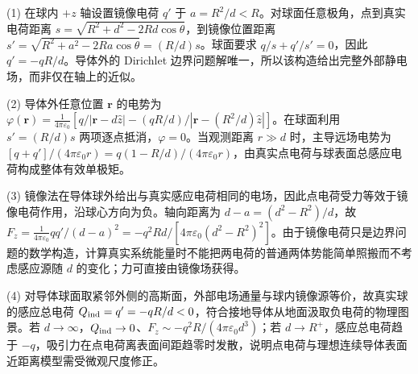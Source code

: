 (1) 在球内 \(+z\) 轴设置镜像电荷 \(q'\) 于 \(a=R^2/d<R\)。对球面任意极角，点到真实电荷距离 \(s=\sqrt{R^2+d^2-2Rd\cos\theta}\)，到镜像位置距离 \(s'=\sqrt{R^2+a^2-2Ra\cos\theta}=(R/d)s\)。球面要求 \(q/s+q'/s'=0\)，因此 \(q'=-qR/d\)。导体外的 Dirichlet 边界问题解唯一，所以该构造给出完整外部静电场，而非仅在轴上的近似。

(2) 导体外任意位置 \(\mathbf r\) 的电势为 \(\varphi(\mathbf r)=\frac{1}{4\pi\varepsilon_0}[q/|\mathbf r-d\hat z|-(qR/d)/|\mathbf r-(R^2/d)\hat z|]\)。在球面利用 \(s'=(R/d)s\) 两项逐点抵消，\(\varphi=0\)。当观测距离 \(r\gg d\) 时，主导远场电势为 \([q+q']/ (4\pi\varepsilon_0r)=q(1-R/d)/(4\pi\varepsilon_0r)\)，由真实点电荷与球表面总感应电荷构成整体有效单极矩。

(3) 镜像法在导体球外给出与真实感应电荷相同的电场，因此点电荷受力等效于镜像电荷作用，沿球心方向为负。轴向距离为 \(d-a=(d^2-R^2)/d\)，故 \(F_z=\frac1{4\pi\varepsilon_0}qq'/(d-a)^2=-q^2Rd/[4\pi\varepsilon_0(d^2-R^2)^2]\)。由于镜像电荷只是边界问题的数学构造，计算真实系统能量时不能把两电荷的普通两体势能简单照搬而不考虑感应源随 \(d\) 的变化；力可直接由镜像场获得。

(4) 对导体球面取紧邻外侧的高斯面，外部电场通量与球内镜像源等价，故真实球的感应总电荷 \(Q_{\rm ind}=q'=-qR/d<0\)，符合接地导体从地面汲取负电荷的物理图景。若 \(d\to\infty\)，\(Q_{\rm ind}\to0\)、\(F_z\sim-q^2R/(4\pi\varepsilon_0d^3)\)；若 \(d\to R^+\)，感应总电荷趋于 \(-q\)，吸引力在点电荷离表面间距趋零时发散，说明点电荷与理想连续导体表面近距离模型需受微观尺度修正。

